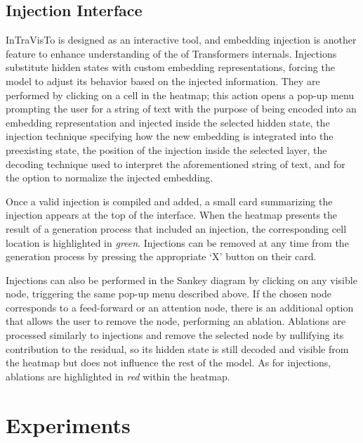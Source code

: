 \documentclass[11pt,a4paper,twocolumn]{article}
\begin{document}
\subsection{Injection Interface}

InTraVisTo is designed as an interactive tool, and embedding injection is another feature to enhance understanding of the of Transformers internals.
Injections substitute hidden states with custom embedding representations, forcing the model to adjust its behavior based on the injected information.
They are performed by clicking on a cell in the heatmap; this action opens a pop-up menu prompting the user for a string of text with the purpose of being encoded into an embedding representation and injected inside the selected hidden state, the injection technique specifying how the new embedding is integrated into the preexisting state, the position of the injection inside the selected layer, the decoding technique used to interpret the aforementioned string of text, and for the option to normalize the injected embedding.

Once a valid injection is compiled and added, a small card summarizing the injection appears at the top of the interface.
When the heatmap presents the result of a generation process that included an injection, the corresponding cell location is highlighted in \emph{green}.
Injections can be removed at any time from the generation process by pressing the appropriate `X' button on their card.

Injections can also be performed in the Sankey diagram by clicking on any visible node, triggering the same pop-up menu described above.
If the chosen node corresponds to a feed-forward or an attention node, there is an additional option that allows the user to remove the node, performing an ablation.
Ablations are processed similarly to injections and remove the selected node by nullifying its contribution to the residual, so its hidden state is still decoded and visible from the heatmap but does not influence the rest of the model.
As for injections, ablations are highlighted in \emph{red} within the heatmap.

\section{Experiments}\label{sec:experiments}
\end{document}
